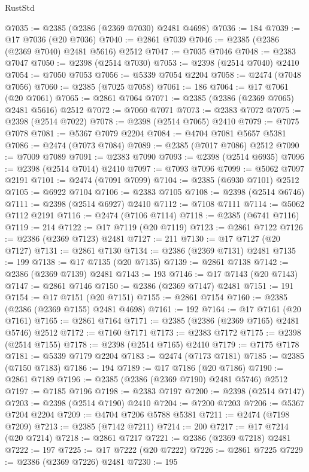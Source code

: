 \begin{lexlean}{RustStd}
\begin{coremodule}
@7035 := @2385 (@2386 (@2369 @7030) @2481 @4698)
@7036 := 184
@7039 := @17 @7036 (@20 @7036)
@7040 := @2861 @7039
@7046 := @2385 (@2386 (@2369 @7040) @2481 @5616) @2512
@7047 := @7035 @7046
@7048 := @2383 @7047
@7050 := @2398 (@2514 @7030)
@7053 := @2398 (@2514 @7040) @2410
@7054 := @7050 @7053
@7056 := @5339 @7054 @2204
@7058 := @2474 (@7048 @7056)
@7060 := @2385 (@7025 @7058)
@7061 := 186
@7064 := @17 @7061 (@20 @7061)
@7065 := @2861 @7064
@7071 := @2385 (@2386 (@2369 @7065) @2481 @5616) @2512
@7072 := @7060 @7071
@7073 := @2383 @7072
@7075 := @2398 (@2514 @7022)
@7078 := @2398 (@2514 @7065) @2410
@7079 := @7075 @7078
@7081 := @5367 @7079 @2204
@7084 := @4704 @7081 @5657 @5381
@7086 := @2474 (@7073 @7084)
@7089 := @2385 (@7017 @7086) @2512
@7090 := @7009 @7089
@7091 := @2383 @7090
@7093 := @2398 (@2514 @6935)
@7096 := @2398 (@2514 @7014) @2410
@7097 := @7093 @7096
@7099 := @5062 @7097 @2191
@7101 := @2474 (@7091 @7099)
@7104 := @2385 (@6930 @7101) @2512
@7105 := @6922 @7104
@7106 := @2383 @7105
@7108 := @2398 (@2514 @6746)
@7111 := @2398 (@2514 @6927) @2410
@7112 := @7108 @7111
@7114 := @5062 @7112 @2191
@7116 := @2474 (@7106 @7114)
@7118 := @2385 (@6741 @7116)
@7119 := 214
@7122 := @17 @7119 (@20 @7119)
@7123 := @2861 @7122
@7126 := @2386 (@2369 @7123) @2481
@7127 := 211
@7130 := @17 @7127 (@20 @7127)
@7131 := @2861 @7130
@7134 := @2386 (@2369 @7131) @2481
@7135 := 199
@7138 := @17 @7135 (@20 @7135)
@7139 := @2861 @7138
@7142 := @2386 (@2369 @7139) @2481
@7143 := 193
@7146 := @17 @7143 (@20 @7143)
@7147 := @2861 @7146
@7150 := @2386 (@2369 @7147) @2481
@7151 := 191
@7154 := @17 @7151 (@20 @7151)
@7155 := @2861 @7154
@7160 := @2385 (@2386 (@2369 @7155) @2481 @4698)
@7161 := 192
@7164 := @17 @7161 (@20 @7161)
@7165 := @2861 @7164
@7171 := @2385 (@2386 (@2369 @7165) @2481 @5746) @2512
@7172 := @7160 @7171
@7173 := @2383 @7172
@7175 := @2398 (@2514 @7155)
@7178 := @2398 (@2514 @7165) @2410
@7179 := @7175 @7178
@7181 := @5339 @7179 @2204
@7183 := @2474 (@7173 @7181)
@7185 := @2385 (@7150 @7183)
@7186 := 194
@7189 := @17 @7186 (@20 @7186)
@7190 := @2861 @7189
@7196 := @2385 (@2386 (@2369 @7190) @2481 @5746) @2512
@7197 := @7185 @7196
@7198 := @2383 @7197
@7200 := @2398 (@2514 @7147)
@7203 := @2398 (@2514 @7190) @2410
@7204 := @7200 @7203
@7206 := @5367 @7204 @2204
@7209 := @4704 @7206 @5788 @5381
@7211 := @2474 (@7198 @7209)
@7213 := @2385 (@7142 @7211)
@7214 := 200
@7217 := @17 @7214 (@20 @7214)
@7218 := @2861 @7217
@7221 := @2386 (@2369 @7218) @2481
@7222 := 197
@7225 := @17 @7222 (@20 @7222)
@7226 := @2861 @7225
@7229 := @2386 (@2369 @7226) @2481
@7230 := 195

\end{coremodule}
\end{lexlean}
